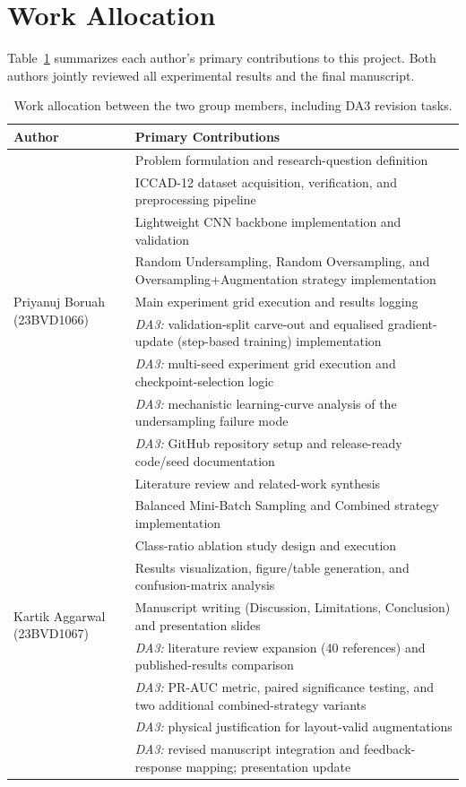 \documentclass[conference]{IEEEtran}
\begin{document}
\section{Work Allocation}
\label{sec:workallocation}
Table~\ref{tab:workalloc} summarizes each author's primary
contributions to this project. Both authors jointly reviewed all
experimental results and the final manuscript.

\begin{table}[H]
\centering
\caption{Work allocation between the two group members, including DA3 revision tasks.}
\label{tab:workalloc}
\begin{tabular}{p{2.1cm}p{5.7cm}}
\toprule
Author & Primary Contributions \\
\midrule
\multirow{9}{2.1cm}{Priyanuj Boruah (23BVD1066)}
 & Problem formulation and research-question definition \\
 & ICCAD-12 dataset acquisition, verification, and preprocessing pipeline \\
 & Lightweight CNN backbone implementation and validation \\
 & Random Undersampling, Random Oversampling, and Oversampling+Augmentation strategy implementation \\
 & Main experiment grid execution and results logging \\
 & \emph{DA3:} validation-split carve-out and equalised gradient-update (step-based training) implementation \\
 & \emph{DA3:} multi-seed experiment grid execution and checkpoint-selection logic \\
 & \emph{DA3:} mechanistic learning-curve analysis of the undersampling failure mode \\
 & \emph{DA3:} GitHub repository setup and release-ready code/seed documentation \\
\midrule
\multirow{9}{2.1cm}{Kartik Aggarwal (23BVD1067)}
 & Literature review and related-work synthesis \\
 & Balanced Mini-Batch Sampling and Combined strategy implementation \\
 & Class-ratio ablation study design and execution \\
 & Results visualization, figure/table generation, and confusion-matrix analysis \\
 & Manuscript writing (Discussion, Limitations, Conclusion) and presentation slides \\
 & \emph{DA3:} literature review expansion (40 references) and published-results comparison \\
 & \emph{DA3:} PR-AUC metric, paired significance testing, and two additional combined-strategy variants \\
 & \emph{DA3:} physical justification for layout-valid augmentations \\
 & \emph{DA3:} revised manuscript integration and feedback-response mapping; presentation update \\
\bottomrule
\end{tabular}
\end{table}
\end{document}
